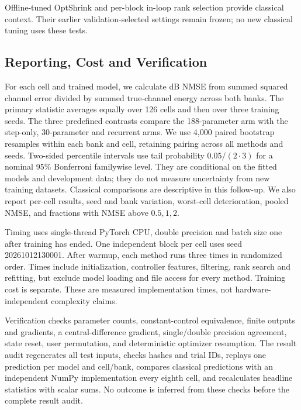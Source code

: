 Offline-tuned OptShrink and per-block in-loop rank selection provide
classical context. Their earlier validation-selected settings remain
frozen; no new classical tuning uses these tests.

\subsection{Reporting, Cost and Verification}
For each cell and trained model, we calculate dB NMSE from summed squared
channel error divided by summed true-channel energy across both banks.
The primary statistic averages equally over 126 cells and then over
three training seeds. The three predefined contrasts compare the
188-parameter arm with the step-only, 30-parameter and recurrent arms.
We use 4,000 paired bootstrap resamples within each bank and cell,
retaining pairing across all methods and seeds. Two-sided percentile
intervals use tail probability $0.05/(2\cdot3)$ for a nominal 95\%
Bonferroni familywise level. They are conditional on the fitted models
and development data; they do not measure uncertainty from new training
datasets. Classical comparisons are descriptive in this follow-up.
We also report per-cell results, seed and bank variation, worst-cell
deterioration, pooled NMSE, and fractions with NMSE above $0.5,1,2$.

Timing uses single-thread PyTorch CPU, double precision and batch size
one after training has ended. One independent block per cell uses seed
20261012130001. After warmup, each method runs three times in randomized
order. Times include initialization, controller features, filtering,
rank search and refitting, but exclude model loading and file access
for every method. Training cost is separate. These are measured
implementation times, not hardware-independent complexity claims.

Verification checks parameter counts, constant-control equivalence,
finite outputs and gradients, a central-difference gradient, single/double
precision agreement, state reset, user permutation, and deterministic
optimizer resumption. The result audit regenerates all test inputs,
checks hashes and trial IDs, replays one prediction per model and
cell/bank, compares classical predictions with an independent NumPy
implementation every eighth cell, and recalculates headline statistics
with scalar sums. No outcome is inferred from these checks before the
complete result audit.


